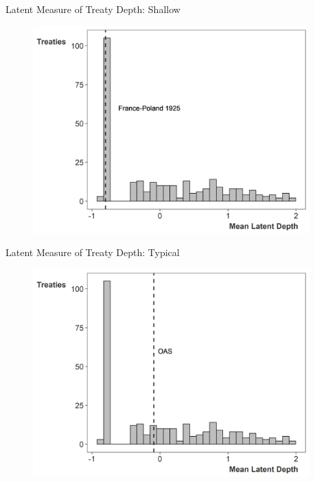 \documentclass[12pt]{beamer}
\begin{document}

\begin{frame}{Latent Measure of Treaty Depth: Shallow}

\begin{figure}[htbp]
	\centering
		\includegraphics[width=0.95\textwidth]{ld-hist-shallow.png}
\end{figure}


\end{frame} 


\begin{frame}{Latent Measure of Treaty Depth: Typical}

\begin{figure}[htbp]
	\centering
		\includegraphics[width=0.95\textwidth]{ld-hist-median.png}
\end{figure}


\end{frame} 
\end{document}
